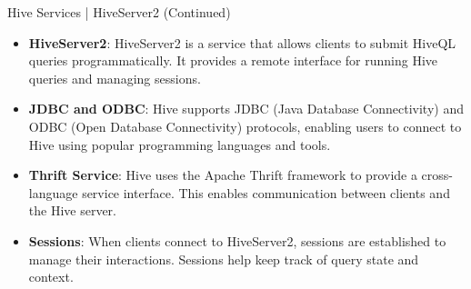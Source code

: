 \begin{frame}{Hive Services | HiveServer2 (Continued)}
	\begin{itemize}
		\item \textbf{HiveServer2}: HiveServer2 is a service that allows clients to submit HiveQL queries programmatically. It provides a remote interface for running Hive queries and managing sessions.
		\item \textbf{JDBC and ODBC}: Hive supports JDBC (Java Database Connectivity) and ODBC (Open Database Connectivity) protocols, enabling users to connect to Hive using popular programming languages and tools.
		\item \textbf{Thrift Service}: Hive uses the Apache Thrift framework to provide a cross-language service interface. This enables communication between clients and the Hive server.
		\item \textbf{Sessions}: When clients connect to HiveServer2, sessions are established to manage their interactions. Sessions help keep track of query state and context.
	\end{itemize}
\end{frame}


